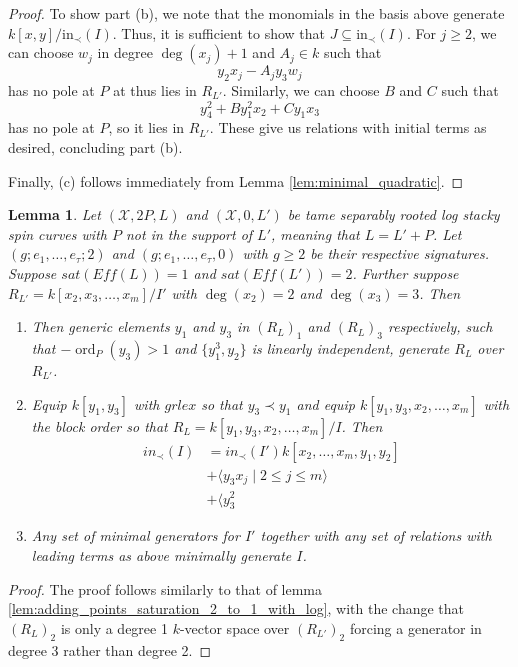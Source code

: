 \documentclass{amsart}
\theoremstyle{plain}
\newtheorem{lem}[thm]{Lemma}
\theoremstyle{definition}
\theoremstyle{remark}
\numberwithin{equation}{section}
\newcommand \sx{\mathscr X}
\DeclareMathOperator{\ord}{ord}
\newcommand \halfcan{L}
\newcommand \initial{\text{in}}
\begin{document}
{\begin{proof}
To show part (b), we note that the monomials in the basis above generate $k[x,y]/\initial_
\prec(I)$.  Thus, it is sufficient to show that $J\subseteq \initial_\prec(I)$.  For $j\ge 2$, we 
can choose $w_j$ in degree $\deg(x_j)+1$ and $A_j\in k$ such that
\[
	y_2x_j-A_jy_3w_j
\]
has no pole at $P$ at thus lies in $R_{\halfcan'}$.  Similarly, we can choose $B$ and $C$ 
such that
\[y^2_4+By_1^2x_2+Cy_1x_3\]
has no pole at $P$, so it lies in $R_{\halfcan'}$.  These give us relations with initial terms 
as desired, concluding part (b).

Finally, (c) follows immediately from Lemma \ref{lem:minimal_quadratic}.

\end{proof}

\begin{lem}
\label{lem:adding_points_saturation_2_to_1_no_log}
Let $(\sx, 2P, \halfcan)$ and $(\sx, 0, L')$ be tame separably rooted log stacky spin curves 
with $P$ not in the support of $\halfcan'$, meaning that $L=L'+P$.  Let $(g; e_1, \ldots, e_
\tau; 2)$ and $(g; e_1, \ldots, e_\tau, 0)$ with $g\ge 2$ be their respective signatures.  
Suppose $sat(Eff(\halfcan))=1$ and $sat(Eff(\halfcan'))=2$.  Further suppose 
$R_{\halfcan'} = k[x_2, x_3, \ldots, x_m]/I'$ with $\deg(x_2) = 2$ and $\deg(x_3) = 3$.  
Then
\begin{enumerate}
\item[(a)] Then generic elements $y_1$ and $y_3$ in $(R_{\halfcan})_1$ and $
(R_{\halfcan})_3$ respectively, such that $-\ord_P(y_3)>1$ and $\{y_1^3, y_2\}$ is linearly 
independent, generate $R_\halfcan$ over $R_{\halfcan'}$.
\item[(b)] Equip $k[y_1,y_3]$ with $grlex$ so that $y_3 \prec y_1$ and equip $k[y_1, y_3, 
x_2, \ldots, x_m]$ with the block order so that $R_\halfcan=k[y_1, y_3, x_2, \ldots, x_m]/I$.  
Then
\begin{align*}
			in_\prec(I) &= in_\prec(I')k[x_2, \ldots, x_m, y_1, y_2] \\
			&+\langle y_3 x_j \mid 2 \leq j \leq m \rangle \\
			&+\langle y_3^2
		\end{align*}
\item[(c)] Any set of minimal generators for $I'$ together with any set of relations with 
leading terms as above minimally generate $I$.
\end{enumerate}
\end{lem}
\begin{proof}
The proof follows similarly to that of lemma 
\ref{lem:adding_points_saturation_2_to_1_with_log}, with the change that $(R_
\halfcan)_2$ is only a degree 1 $k$-vector space over $(R_{\halfcan'})_2$ forcing a 
generator in degree 3 rather than degree 2.  
\end{proof}

}
\end{document}
